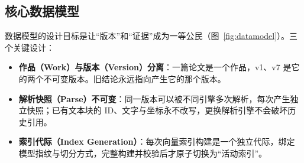 \subsection{核心数据模型}

数据模型的设计目标是让“版本”和“证据”成为一等公民（图~\ref{fig:datamodel}）。三个关键设计：

\begin{itemize}
  \item \textbf{作品（Work）与版本（Version）分离}：一篇论文是一个作品，v1、v7 是它的两个不可变版本。旧结论永远指向产生它的那个版本。
  \item \textbf{解析快照（Parse）不可变}：同一版本可以被不同引擎多次解析，每次产生独立快照；已有文本块的 ID、文字与坐标永不改写，更换解析引擎不会破坏历史引用。
  \item \textbf{索引代际（Index Generation）}：每次向量索引构建是一个独立代际，绑定模型指纹与切分方式，完整构建并校验后才原子切换为“活动索引”。
\end{itemize}

